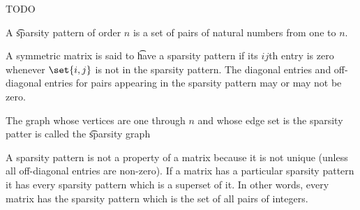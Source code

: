 
\sbasic







































\sstart
{}


TODO


A \t{sparsity pattern} of order $n$ is a set of pairs of natural numbers from one to $n$.

A symmetric matrix is said to \t{have a sparsity pattern} if its $ij$th entry is zero whenever $\set{i, j}$ is not in the sparsity pattern. The diagonal entries and off-diagonal entries for pairs appearing in the sparsity pattern may or may not be zero.

The graph whose vertices are one through $n$ and whose edge set is the sparsity patter is called the \t{sparsity graph}

A sparsity pattern is not a property of a matrix because it is not unique (unless all off-diagonal entries are non-zero). If a matrix has a particular sparsity pattern it has every sparsity pattern which is a superset of it.
In other words, every matrix has the sparsity pattern which is the set of all pairs of integers.


